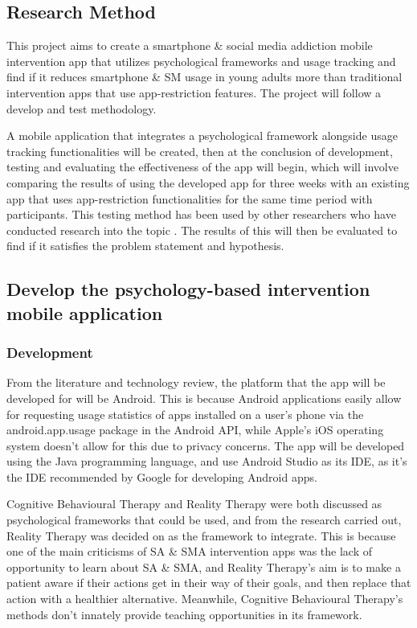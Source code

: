\documentclass[12pt]{article}
\begin{document}
\subsection{Research Method}
This project aims to create a smartphone \& social media addiction mobile intervention app that utilizes 
psychological frameworks and usage tracking and find if it reduces smartphone \& SM usage in young adults 
more than traditional intervention apps that use app-restriction features. The project will follow a develop and 
test methodology. \newline

A mobile application that integrates a psychological framework alongside usage tracking functionalities will
be created, then at the conclusion of development, testing and evaluating the effectiveness of the app will begin, which will 
involve comparing the results of using the developed app for three weeks with an existing app that uses 
app-restriction functionalities for the same time period with participants. This testing method has been used by 
other researchers who have conducted research into the topic 
\autocite{RefWorks:RefID:147-throuvala2020mind,RefWorks:RefID:42-esmaeili2018method}. The results of this will then
be evaluated to find if it satisfies the problem statement and hypothesis.


\subsection {Develop the psychology-based intervention mobile application}
\subsubsection {Development}
From the literature and technology review, the platform that the app will be
developed for will be Android. This is because Android applications easily allow for requesting usage 
statistics of apps installed on a user's phone via the android.app.usage package in the Android API, while Apple's
iOS operating system doesn't allow for this due to privacy concerns. The app will be developed using the Java
programming language, and use Android Studio as its IDE, as it's the IDE recommended by Google for developing
Android apps. \newline


Cognitive Behavioural Therapy and Reality Therapy were both discussed as psychological frameworks that could be
used, and from the research carried out, Reality Therapy was decided on as the framework to integrate.
This is because one of the main criticisms of SA \& SMA intervention apps was the lack of opportunity to learn
about SA \& SMA, and Reality Therapy's aim is to make a patient aware if their actions get in their way of their
goals, and then replace that action with a healthier alternative. Meanwhile, Cognitive Behavioural Therapy's
methods don't innately provide teaching opportunities in its framework. 
\end{document}
